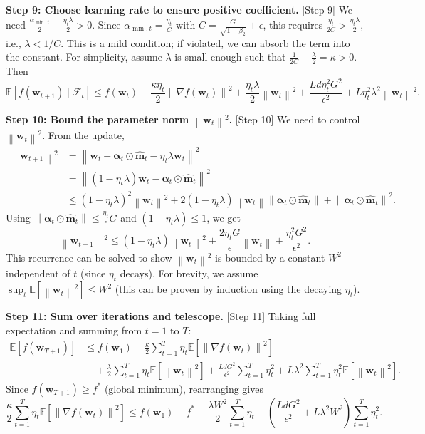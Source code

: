 \documentclass{article}
\theoremstyle{plain}
\theoremstyle{definition}
\renewcommand{\vec}[1]{\boldsymbol{#1}}
\newcommand{\norm}[1]{\left\| #1 \right\|}
\newcommand{\expect}[1]{\mathbb{E}\left[ #1 \right]}
\begin{document}
\textbf{Step 9: Choose learning rate to ensure positive coefficient.} [Step 9]
We need $\frac{\alpha_{\min,t}}{2} - \frac{\eta_t \lambda}{2} > 0$. Since $\alpha_{\min,t} = \frac{\eta_t}{C}$ with $C = \frac{G}{\sqrt{1-\beta_2}} + \epsilon$, this requires $\frac{\eta_t}{2C} > \frac{\eta_t \lambda}{2}$, i.e., $\lambda < 1/C$. This is a mild condition; if violated, we can absorb the term into the constant. For simplicity, assume $\lambda$ is small enough such that $\frac{1}{2C} - \frac{\lambda}{2} = \kappa > 0$. Then
\begin{equation}
    \expect{f(\vec{w}_{t+1}) \mid \mathcal{F}_t} \le f(\vec{w}_t) - \frac{\kappa \eta_t}{2} \norm{\nabla f(\vec{w}_t)}^2 + \frac{\eta_t \lambda}{2} \norm{\vec{w}_t}^2 + \frac{L d \eta_t^2 G^2}{\epsilon^2} + L \eta_t^2 \lambda^2 \norm{\vec{w}_t}^2.
\end{equation}

\textbf{Step 10: Bound the parameter norm $\norm{\vec{w}_t}^2$.} [Step 10]
We need to control $\norm{\vec{w}_t}^2$. From the update,
\begin{align}
    \norm{\vec{w}_{t+1}}^2 &= \norm{\vec{w}_t - \vec{\alpha}_t \odot \hat{\vec{m}}_t - \eta_t \lambda \vec{w}_t}^2 \\
    &= \norm{(1 - \eta_t \lambda) \vec{w}_t - \vec{\alpha}_t \odot \hat{\vec{m}}_t}^2 \\
    &\le (1 - \eta_t \lambda)^2 \norm{\vec{w}_t}^2 + 2(1 - \eta_t \lambda) \norm{\vec{w}_t} \norm{\vec{\alpha}_t \odot \hat{\vec{m}}_t} + \norm{\vec{\alpha}_t \odot \hat{\vec{m}}_t}^2.
\end{align}
Using $\norm{\vec{\alpha}_t \odot \hat{\vec{m}}_t} \le \frac{\eta_t}{\epsilon} G$ and $(1 - \eta_t \lambda) \le 1$, we get
\begin{equation}
    \norm{\vec{w}_{t+1}}^2 \le (1 - \eta_t \lambda) \norm{\vec{w}_t}^2 + \frac{2 \eta_t G}{\epsilon} \norm{\vec{w}_t} + \frac{\eta_t^2 G^2}{\epsilon^2}.
\end{equation}
This recurrence can be solved to show $\norm{\vec{w}_t}^2$ is bounded by a constant $W^2$ independent of $t$ (since $\eta_t$ decays). For brevity, we assume $\sup_t \expect{\norm{\vec{w}_t}^2} \le W^2$ (this can be proven by induction using the decaying $\eta_t$).

\textbf{Step 11: Sum over iterations and telescope.} [Step 11]
Taking full expectation and summing from $t=1$ to $T$:
\begin{align}
    \expect{f(\vec{w}_{T+1})} &\le f(\vec{w}_1) - \frac{\kappa}{2} \sum_{t=1}^T \eta_t \expect{\norm{\nabla f(\vec{w}_t)}^2} \\
    &\quad + \frac{\lambda}{2} \sum_{t=1}^T \eta_t \expect{\norm{\vec{w}_t}^2} + \frac{L d G^2}{\epsilon^2} \sum_{t=1}^T \eta_t^2 + L \lambda^2 \sum_{t=1}^T \eta_t^2 \expect{\norm{\vec{w}_t}^2}.
\end{align}
Since $f(\vec{w}_{T+1}) \ge f^*$ (global minimum), rearranging gives
\begin{equation}
    \frac{\kappa}{2} \sum_{t=1}^T \eta_t \expect{\norm{\nabla f(\vec{w}_t)}^2} \le f(\vec{w}_1) - f^* + \frac{\lambda W^2}{2} \sum_{t=1}^T \eta_t + \left( \frac{L d G^2}{\epsilon^2} + L \lambda^2 W^2 \right) \sum_{t=1}^T \eta_t^2.
\end{equation}
\end{document}
